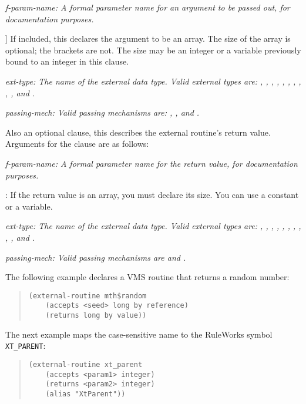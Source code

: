 \it{f-param-name}: A formal parameter name for an argument to be
passed out, for documentation purposes.

\co[[\it{size}]\co] If included, this declares the argument to be an
array. The size of the array is optional; the brackets are not. The
size may be an integer or a variable previously bound to an integer in
this  clause.

\it{ext-type}: The name of the external data type. Valid external
types are: , , , ,
, , ,
, , , and .

\it{passing-mech}: Valid passing mechanisms are: , , and .


Also an optional clause, this describes the external routine's return
value. Arguments for the  clause are as follows:

\it{f-param-name}: A formal parameter name for the return value,
for documentation purposes.

\co[\it{size}\co]: If the return value is an array, you must declare
its size. You can use a constant or a variable.

\it{ext-type}: The name of the external data type. Valid external
types are: , , , ,
, , ,
, , , and .

\it{passing-mech}: Valid passing mechanisms are  and
.

\Example

The following example declares a VMS routine that returns a
random number:
\begin{quote}
\begin{verbatim}
(external-routine mth$random
    (accepts <seed> long by reference)
    (returns long by value))
\end{verbatim}
\end{quote}

The next example maps the case-sensitive name  to the
RuleWorks symbol \verb|XT_PARENT|:

\begin{quote}
\begin{verbatim}
(external-routine xt_parent
    (accepts <param1> integer)
    (returns <param2> integer)
    (alias "XtParent"))
\end{verbatim}
\end{quote} 


